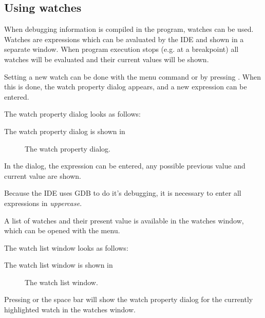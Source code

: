 %
%
\subsection{Using watches}
When debugging information is compiled in the program, watches can be used.
Watches are expressions which can be avaluated by the IDE and shown in a
separate window. When program execution stops (e.g. at a breakpoint) all
watches will be evaluated and their current values will be shown.

Setting a new watch can be done with the  menu 
command or by pressing . When this is done, the watch
property dialog appears, and a new expression can be entered.
\begin{htmlonly}
The watch property dialog looks as follows:
\end{htmlonly}
\begin{latexonly}
The watch property dialog is shown in 
\begin{figure}[ht]
\caption{The watch property dialog.}\label{fig:watch}
\ifpdf
{}
\else
{}
\fi
\end{figure}
\end{latexonly}
In the dialog, the expression can be entered, any possible previous value
and current value are shown.
\begin{remark}
Because the IDE uses GDB to do it's debugging, it is necessary to enter all
expressions in {\em uppercase}. 
\end{remark}
A list of watches and their present value is available in the watches
window, which can be opened with the  menu.
\begin{htmlonly}
The watch list window looks as follows:
\end{htmlonly}
\begin{latexonly}
The watch list window is shown in 
\begin{figure}[ht]
\caption{The watch list window.}\label{fig:watchlst}
\ifpdf
{}
\else
{}
\fi
\end{figure}
\end{latexonly}

Pressing  or the space bar will show the watch property dialog
for the currently highlighted watch in the watches window.

